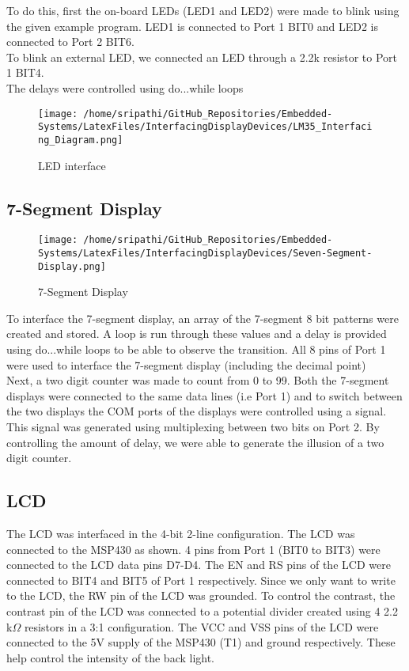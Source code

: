 \documentclass[12pt, letterpaper]{article}
\begin{document}
To do this, first the on-board LEDs (LED1 and LED2) were made to blink using the given example program. LED1 is connected to Port 1 BIT0 and LED2 is connected to Port 2 BIT6.\\
To blink an external LED, we connected an LED through a 2.2k resistor to Port 1 BIT4.\\
The delays were controlled using do...while loops

\begin{figure}[!h]
	\centering
	\texttt{[image: /home/sripathi/GitHub\_Repositories/Embedded-Systems/LatexFiles/InterfacingDisplayDevices/LM35\_Interfacing\_Diagram.png]}
	\caption{LED interface}
	\label{fig:ledInterface}
\end{figure}

\subsection{7-Segment Display}

\begin{wrapfigure}{r}{0.4\textwidth}
	\centering
	\texttt{[image: /home/sripathi/GitHub\_Repositories/Embedded-Systems/LatexFiles/InterfacingDisplayDevices/Seven-Segment-Display.png]}
	\label{fig:7segment}
	\caption{7-Segment Display}
\end{wrapfigure}

To interface the 7-segment display, an array of the 7-segment 8 bit patterns were created and stored. A loop is run through these values and a delay is provided using do...while loops to be able to observe the transition. All 8 pins of Port 1 were used to interface the 7-segment display (including the decimal point)\\
Next, a two digit counter was made to count from 0 to 99. Both the 7-segment displays were connected to the same data lines (i.e Port 1) and to switch between the two displays the COM ports of the displays were controlled using a signal. This signal was generated using multiplexing between two bits on Port 2. By controlling the amount of delay, we were able to generate the illusion of a two digit counter.

\subsection{LCD}

The LCD was interfaced in the 4-bit 2-line configuration. The LCD was connected to the MSP430 as shown. 4 pins from Port 1 (BIT0 to BIT3) were connected to the LCD data pins D7-D4. The EN and RS pins of the LCD were connected to BIT4 and BIT5 of Port 1 respectively. Since we only want to write to the LCD, the RW pin of the LCD was grounded. To control the contrast, the contrast pin of the LCD was connected to a potential divider created using 4 2.2 k$\Omega$ resistors in a 3:1 configuration. The VCC and VSS pins of the LCD were connected to the 5V supply of the MSP430 (T1) and ground respectively. These help control the intensity of the back light.
\end{document}

